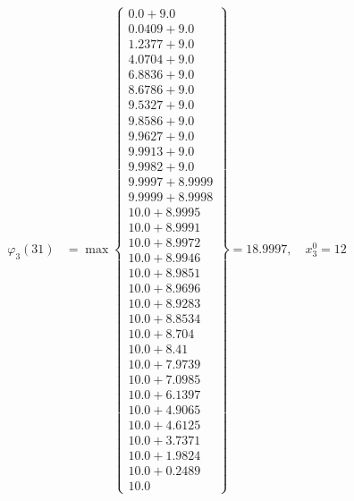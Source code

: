 \documentclass{article}
\begin{document}
\begin{align*}
  
\varphi_{3}(31) &= \max \left\{ \begin{array}{c}
0.0 + 9.0 \\
 0.0409 + 9.0 \\
 1.2377 + 9.0 \\
 4.0704 + 9.0 \\
 6.8836 + 9.0 \\
 8.6786 + 9.0 \\
 9.5327 + 9.0 \\
 9.8586 + 9.0 \\
 9.9627 + 9.0 \\
 9.9913 + 9.0 \\
 9.9982 + 9.0 \\
 9.9997 + 8.9999 \\
 9.9999 + 8.9998 \\
 10.0 + 8.9995 \\
 10.0 + 8.9991 \\
 10.0 + 8.9972 \\
 10.0 + 8.9946 \\
 10.0 + 8.9851 \\
 10.0 + 8.9696 \\
 10.0 + 8.9283 \\
 10.0 + 8.8534 \\
 10.0 + 8.704 \\
 10.0 + 8.41 \\
 10.0 + 7.9739 \\
 10.0 + 7.0985 \\
 10.0 + 6.1397 \\
 10.0 + 4.9065 \\
 10.0 + 4.6125 \\
 10.0 + 3.7371 \\
 10.0 + 1.9824 \\
 10.0 + 0.2489 \\
 10.0
\end{array} \right\}=18.9997,\quad x_{3}^0=12\\
  
  
  

\end{align*}
\end{document}

